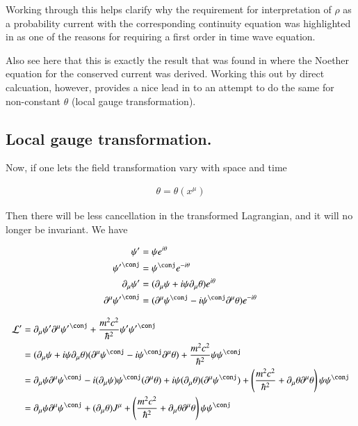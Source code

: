 \documentclass{article}
\begin{document}
Working through this helps clarify why the requirement for interpretation of $\rho$ as a probability current with the
corresponding continuity equation was highlighted in \cite{bohm1989qt} as one of the reasons for requiring a first order in time wave equation.

Also see here that this is exactly the result that was found in \cite{PJNoethersField} where the Noether equation for the conserved current
was derived.  Working this out by direct calcuation, however, provides a nice lead in to an attempt to do the same for non-constant $\theta$
(local gauge transformation).

\subsection{ Local gauge transformation. }

Now, if one lets the field transformation vary with space and time

\begin{align}
\theta = \theta(x^\mu)
\end{align}

Then there will be less cancellation in the transformed Lagrangian, and it will no longer be invariant.  We have

\begin{align*}
\psi' &= \psi e^{i\theta} \\
{\psi'}^\conj &= \psi^\conj e^{-i\theta} \\
\partial_\mu \psi' &= (\partial_\mu \psi + i \psi \partial_\mu \theta ) e^{i\theta}  \\
\partial^\mu {\psi'}^\conj &= (\partial^\mu \psi^\conj - i \psi^\conj \partial^\mu \theta) e^{-i\theta} \\
\end{align*}

\begin{align*}
\LL' 
&= \partial_\mu \psi' \partial^\mu {\psi'}^\conj + \frac{m^2 c^2}{\hbar^2} \psi' {\psi'}^\conj \\
&= 
(\partial_\mu \psi + i \psi \partial_\mu \theta ) (\partial^\mu \psi^\conj - i \psi^\conj \partial^\mu \theta) 
+ \frac{m^2 c^2}{\hbar^2} \psi {\psi}^\conj \\
&= 
\partial_\mu \psi \partial^\mu \psi^\conj 
-i (\partial_\mu \psi) \psi^\conj (\partial^\mu \theta)
+ i \psi (\partial_\mu \theta) (\partial^\mu \psi^\conj)
+ \left( \frac{m^2 c^2}{\hbar^2} + \partial_\mu \theta \partial^\mu \theta \right) \psi {\psi}^\conj \\
&=
\partial_\mu \psi \partial^\mu \psi^\conj 
+ (\partial_\mu \theta) J^\mu %
+ \left( \frac{m^2 c^2}{\hbar^2} + \partial_\mu \theta \partial^\mu \theta \right) \psi {\psi}^\conj \\
\end{align*}
\end{document}
